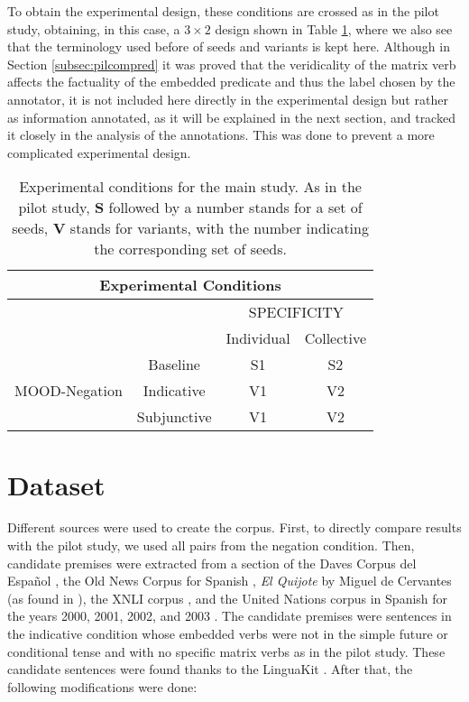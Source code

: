 To obtain the experimental design, these conditions are crossed as in the pilot study, obtaining, in this case, a $3\times2$ design shown in Table \ref{tab:design}, where we also see that the terminology used before of seeds and variants is kept here. Although in Section \ref{subsec:pilcompred} it was proved that the veridicality of the matrix verb affects the factuality of the embedded predicate and thus the label chosen by the annotator, it is not included here directly in the experimental design but rather as information annotated, as it will be explained in the next section, and tracked it closely in the analysis of the annotations. This was done to prevent a more complicated experimental design.\\

\begin{table}
\centering
\begin{tabular}{|c|c|c|c|}
\hline
\multicolumn{4}{|c|}{Experimental Conditions}\\\hline
                      & &\multicolumn{2}{c|}{SPECIFICITY} \\\cline{1-4} 
                      & &Individual&Collective\\\cline{2-4} 
\multirow{3}{*}{MOOD-Negation} & Baseline & S1 & S2 \\\cline{2-4}
                      & Indicative & V1 & V2 \\\cline{2-4}
                      & Subjunctive & V1 & V2  \\ \cline{2-4}\hline                                                          
\end{tabular}

\caption[Experimental conditions main study.]{Experimental conditions for the main study. As in the pilot study, \textbf{S} followed by a number stands for a set of seeds, \textbf{V} stands for variants, with the number indicating the corresponding set of seeds.}
\label{tab:design}
\end{table}

\section{Dataset}
Different sources were used to create the corpus. First, to directly compare results with the pilot study, we used all pairs from the negation condition. Then, candidate premises were extracted from a section of the Daves Corpus del Español \citep{daves2016}, the Old News Corpus for Spanish \citep{oldnews}, \textit{El Quijote} by Miguel de Cervantes (as found in \citet{jsdario2017}), the XNLI corpus \citep{conneau2018xnli}, and the United Nations corpus in Spanish for the years 2000, 2001, 2002, and 2003 \citep{eisele2010multiun}. The candidate premises were sentences in the indicative condition whose embedded verbs were not in the simple future or conditional tense and with no specific matrix verbs as in the pilot study. These candidate sentences were found thanks to the LinguaKit \citep{Gamallo95}. After that, the following modifications were done:\\

